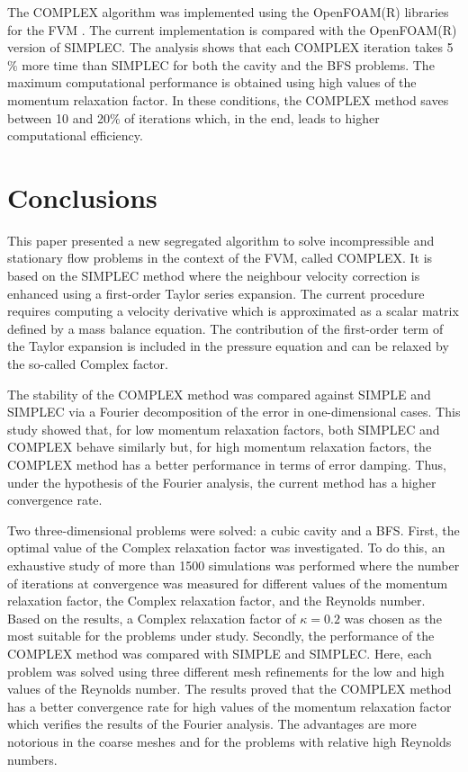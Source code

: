 \documentclass[final,3p,times,11pt,onecolumn]{myElsarticle}
\numberwithin{equation}{section}
\begin{document}
The COMPLEX algorithm was implemented using the OpenFOAM(R) libraries for the FVM \cite{ofpg}. The current implementation is compared with the OpenFOAM(R) version of SIMPLEC. The analysis shows that each COMPLEX iteration takes 5$\%$ more time than SIMPLEC for both the cavity and the BFS problems. The maximum computational performance is obtained using high values of the momentum relaxation factor. In these conditions, the COMPLEX method saves between 10 and 20$\%$ of iterations which, in the end, leads to higher computational efficiency.

\section{Conclusions}
\label{sec:conclusions}
This paper presented a new segregated algorithm to solve incompressible and stationary flow problems in the context of the FVM, called COMPLEX. It is based on the SIMPLEC method where the neighbour velocity correction is enhanced using a first-order Taylor series expansion. The current procedure requires computing a velocity derivative which is approximated as a scalar matrix defined by a mass balance equation. The contribution of the first-order term of the Taylor expansion is included in the pressure equation and can be relaxed by the so-called Complex factor.

The stability of the COMPLEX method was compared against SIMPLE and SIMPLEC via a Fourier decomposition of the error in one-dimensional cases. This study showed that, for low momentum relaxation factors, both SIMPLEC and COMPLEX behave similarly but, for high momentum relaxation factors, the COMPLEX method has a better performance in terms of error damping. Thus, under the hypothesis of the Fourier analysis, the current method has a higher convergence rate.

Two three-dimensional problems were solved: a cubic cavity and a BFS. First, the optimal value of the Complex relaxation factor was investigated. To do this, an exhaustive study of more than 1500 simulations was performed where the number of iterations at convergence was measured for different values of the momentum relaxation factor, the Complex relaxation factor, and the Reynolds number. Based on the results, a Complex relaxation factor of $\kappa = 0.2$ was chosen as the most suitable for the problems under study. Secondly, the performance of the COMPLEX method was compared with SIMPLE and SIMPLEC. Here, each problem was solved using three different mesh refinements for the low and high values of the Reynolds number. The results proved that the COMPLEX method has a better convergence rate for high values of the momentum relaxation factor which verifies the results of the Fourier analysis. The advantages are more notorious in the coarse meshes and for the problems with relative high Reynolds numbers. %
\end{document}
